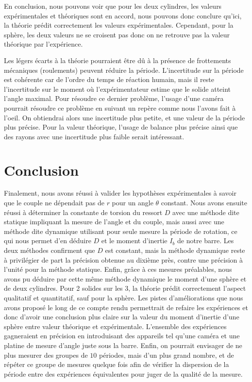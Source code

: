 \documentclass[11pt]{article}
\begin{document}
En conclusion, nous pouvons voir que pour les deux cylindres, les valeurs expérimentales et théoriques sont en accord, nous pouvons donc conclure qu'ici, la théorie prédit correctement
les valeurs expérimentales.
Cependant, pour la sphère, les deux valeurs ne se croisent pas donc on ne retrouve pas la valeur théorique par l'expérience.

Les légers écarts à la théorie pourraient être dû à la présence de frottements mécaniques (roulements) peuvent réduire la période. L'incertitude sur la période est cohérente car de l'ordre 
du temps de réaction humain, mais il reste l'incertitude sur le moment où l'expérimentateur estime que le solide atteint l'angle maximal. Pour résoudre ce dernier problème,
l'usage d'une caméra pourrait résoudre ce problème en suivant un repère comme nous l'avons fait à l'oeil. On obtiendrai alors une incertitude plus petite, et une
valeur de la période plus précise. Pour la valeur théorique, l'usage de balance plus précise ainsi que des rayons avec une incertitude plus faible serait intéressant.

\section{Conclusion}
Finalement, nous avons réussi à valider les hypothèses expérimentales à savoir que le couple ne dépendait pas de $r$ pour un angle $\theta$ constant. Nous avons
ensuite réussi à déterminer la constante de torsion du ressort $D$ avec une méthode dite statique impliquant la mesure de l'angle et du couple, mais aussi avec une méthode dite dynamique utilisant
pour seule mesure la période de rotation, ce qui nous permet d'en déduire $D$ et le moment d'inertie $I_b$ de notre barre. Les deux méthodes confirment que $D$ est constant, mais
la méthode dynamique reste à privilégier de part la précision obtenue au dixième près, contre une précision à l'unité pour la méthode statique. 
Enfin, grâce à ces mesures préalables, nous avons pu déduire par cette même méthode dynamique le moment d'une sphère et de deux cylindres.
Pour 2 solides sur les 3, la théorie prédit correctement l'aspect qualitatif et quantitatif, sauf pour la sphère. Les pistes d'améliorations que nous avons proposé 
le long de ce compte rendu permettrait de refaire les expériences et donc d'avoir une conclusion plus claire sur la valeur du moment d'inertie d'une sphère entre valeur théorique et expérimentale. L'ensemble des expériences gagneraient en précision 
en introduisant des appareils tel qu'une caméra et une platine de mesure d'angle juste sous la barre. Enfin, on pourrait envisager de ne plus mesurer des groupes de $10$ périodes, mais d'un plus grand nombre, et de répéter ce groupe de mesures quelque fois afin de vérifier
la dispersion de la période entre des expériences équivalentes pour juger de la qualité de la mesure.
\end{document}

